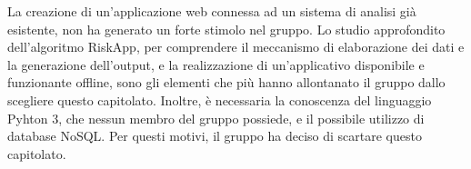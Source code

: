 La creazione di un'applicazione web connessa ad un sistema di analisi già esistente, non ha generato un forte stimolo nel gruppo. Lo studio approfondito dell’algoritmo RiskApp, per comprendere il meccanismo di elaborazione dei dati e la generazione dell'output, e la realizzazione di un'applicativo disponibile e funzionante offline, sono gli elementi che più hanno allontanato il gruppo dallo scegliere questo capitolato. 
Inoltre, è necessaria la conoscenza del linguaggio Pyhton 3, che nessun membro del gruppo possiede, e il possibile utilizzo di database NoSQL.
Per questi motivi, il gruppo ha deciso di scartare questo capitolato. 